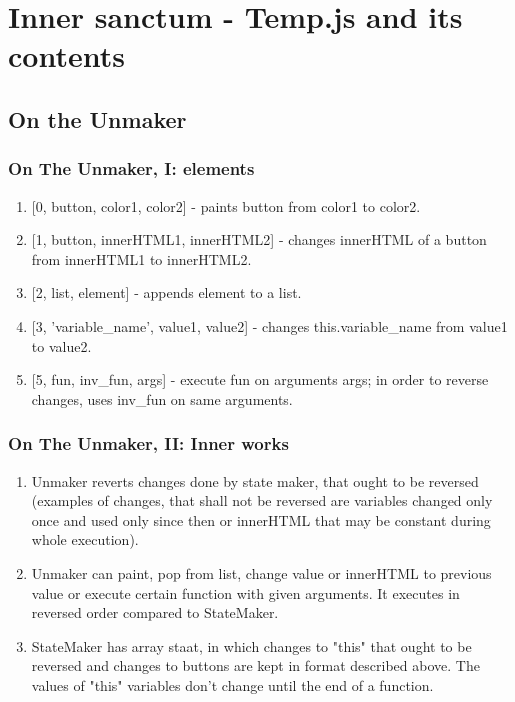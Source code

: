 \documentclass[12pt]{article}
\begin{document}
\section {Inner sanctum - Temp.js and its contents}


\subsection {On the Unmaker}
\subsubsection{On The Unmaker, I: elements}
\begin {enumerate}
	\item {[0, button, color1, color2]} - paints button from color1 to color2.
	\item {[1, button, innerHTML1, innerHTML2]} - changes innerHTML of a button from innerHTML1 to innerHTML2.
	\item {[2, list, element]} - appends element to a list.
	\item {[3, 'variable\_name', value1, value2]} - changes this.variable\_name from value1 to value2.
	\item {[5, fun, inv\_fun, args]} - execute fun on arguments args; in order to reverse changes, uses inv\_fun on same arguments.
\end{enumerate}

\subsubsection{On The Unmaker, II: Inner works}
\begin {enumerate}
	\item Unmaker reverts changes done by state maker, that ought to be reversed (examples of changes, that shall not be reversed are variables changed only once and used only since then or innerHTML that may be constant during whole execution).
	\item Unmaker can paint, pop from list, change value or innerHTML to previous value or execute certain function with given arguments. It executes in reversed order compared to StateMaker.
	\item StateMaker has array staat, in which changes to "this" that ought to be reversed and changes to buttons are kept in format described above. The values of "this" variables don't change until the end of a function.
\end {enumerate}
\end{document}
